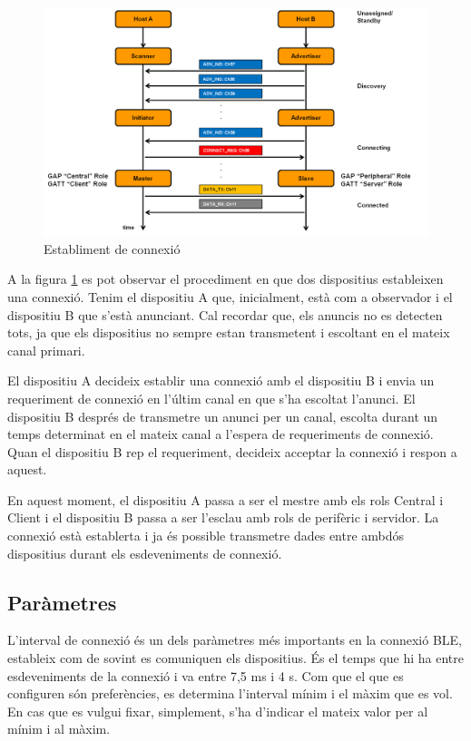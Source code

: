 \begin{figure}[!h]
	\begin{center}
		\includegraphics[width=1\textwidth]{./images/rols_unicast.png}
		\caption{Establiment de connexió \cite{fig:connection_establishement}}
		\label{fig:unicast_roles}
	\end{center}
\end{figure}


A la figura \ref{fig:unicast_roles} es pot observar el procediment en que dos dispositius estableixen una connexió.
Tenim el dispositiu A que, inicialment, està com a observador i el dispositiu B que s'està anunciant.
Cal recordar que, els anuncis no es detecten tots, ja que els dispositius no sempre estan transmetent i escoltant en el mateix canal primari.

El dispositiu A decideix establir una connexió amb el dispositiu B i envia un requeriment de connexió en l'últim canal en que s'ha escoltat l'anunci.
El dispositiu B després de transmetre un anunci per un canal, escolta durant un temps determinat en el mateix canal a l'espera de requeriments de connexió.
Quan el dispositiu B rep el requeriment, decideix acceptar la connexió i respon a aquest.

En aquest moment, el dispositiu A passa a ser el mestre amb els rols Central i Client i el dispositiu B passa a ser l'esclau amb rols de perifèric i servidor.
La connexió està establerta i ja és possible transmetre dades entre ambdós dispositius durant els esdeveniments de connexió. 


\subsection{Paràmetres}
\label{sec:params}
L'interval de connexió és un dels paràmetres més importants en la connexió BLE, estableix com de sovint es comuniquen els dispositius.
És el temps que hi ha entre esdeveniments de la connexió i va entre 7,5 ms i 4 s.
Com que el que es configuren són preferències, es determina l'interval mínim i el màxim que es vol.
En cas que es vulgui fixar, simplement, s'ha d'indicar el mateix valor per al mínim i al màxim.

